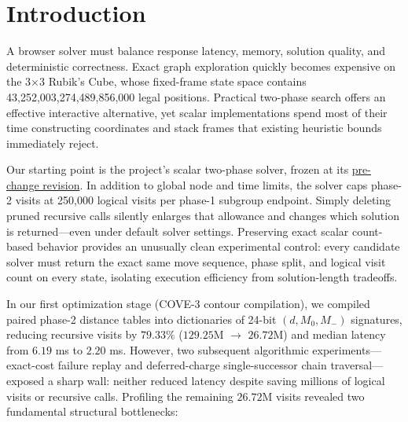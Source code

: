 \documentclass[10pt,twocolumn,letterpaper]{article}
\begin{document}
\hypertarget{introduction}{%
\section{Introduction}\label{introduction}}

A browser solver must balance response latency, memory, solution
quality, and deterministic correctness. Exact graph exploration quickly
becomes expensive on the 3×3 Rubik's Cube, whose fixed-frame state space
contains 43,252,003,274,489,856,000 legal positions. Practical two-phase
search offers an effective interactive alternative, yet scalar
implementations spend most of their time constructing coordinates and
stack frames that existing heuristic bounds immediately reject.

Our starting point is the project's scalar two-phase solver, frozen at
its
\href{https://github.com/nahin333/rubikscube/commit/e7023a8d96681c6a4c23a19c4c4ecb5208b910e4}{pre-change
revision}. In addition to global node and time limits, the solver caps
phase-2 visits at 250,000 logical visits per phase-1 subgroup endpoint.
Simply deleting pruned recursive calls silently enlarges that allowance
and changes which solution is returned---even under default solver
settings. Preserving exact scalar count-based behavior provides an
unusually clean experimental control: every candidate solver must return
the exact same move sequence, phase split, and logical visit count on
every state, isolating execution efficiency from solution-length
tradeoffs.

In our first optimization stage (COVE-3 contour compilation), we
compiled paired phase-2 distance tables into dictionaries of 24-bit
\((d, M_0, M_-)\) signatures, reducing recursive visits by \(79.33\%\)
(\(129.25\)M \(\to\) \(26.72\)M) and median latency from \(6.19\) ms to
\(2.20\) ms. However, two subsequent algorithmic
experiments---exact-cost failure replay and deferred-charge
single-successor chain traversal---exposed a sharp wall: neither reduced
latency despite saving millions of logical visits or recursive calls.
Profiling the remaining \(26.72\)M visits revealed two fundamental
structural bottlenecks:
\end{document}
